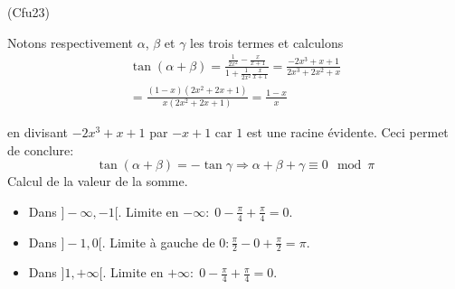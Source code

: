 \begin{tiny}(Cfu23)\end{tiny} Notons respectivement $\alpha$, $\beta$ et $\gamma$ les trois termes et calculons
\begin{multline*}
  \tan(\alpha + \beta) =
\frac{\frac{1}{2x^2} - \frac{x}{x+1}}{1+\frac{1}{2x^2}\frac{x}{x+1}}
= \frac{-2x^3 + x +1}{2x^3 + 2x^2 +x} \\
= \frac{(1-x)(2x^2+2x+1)}{x(2x^2+2x+1)}= \frac{1-x}{x}
\end{multline*}

en divisant $-2x^3 + x +1$ par $-x+1$ car $1$ est une racine évidente. Ceci permet de conclure:
\begin{displaymath}
\tan(\alpha + \beta) = - \tan \gamma \Rightarrow \alpha + \beta + \gamma \equiv 0 \mod \pi  
\end{displaymath}
Calcul de la valeur de la somme.
\begin{itemize}
  \item Dans $]-\infty, -1[$. Limite en $-\infty : \; 0 - \frac{\pi}{4} + \frac{\pi}{4} = 0$.
  \item Dans $]-1,0[$. Limite à gauche de $0 : \frac{\pi}{2} -0 + \frac{\pi}{2} = \pi$. 
  \item Dans $]1, +\infty[$. Limite en $+\infty : \; 0 - \frac{\pi}{4} + \frac{\pi}{4} = 0$.
\end{itemize}

